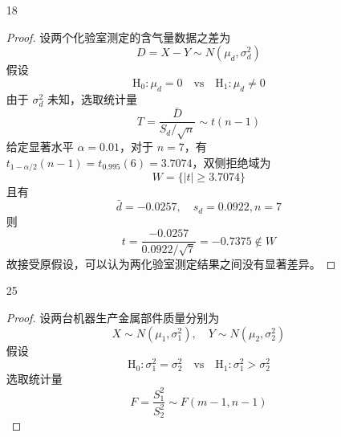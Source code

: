 \documentclass[normal,founder,mtpro2,cn]{elegantnote}
\begin{document}
\begin{enumerate}
\begin{proof}
        \end{proof}
    \item[18]
        \begin{proof}
            设两个化验室测定的含气量数据之差为
            \begin{equation*}
                D=X-Y\sim N\left(\mu_{d},\sigma_{d}^{2}\right)
            \end{equation*}
            假设
            \begin{equation*}
                \mathrm{H}_{0}:\mu_{d}=0\quad\text{vs}\quad\mathrm{H}_{1}:\mu_{d}\neq 0
            \end{equation*}
            由于 $\sigma_{d}^{2}$ 未知，选取统计量
            \begin{equation*}
                T=\frac{\bar{D}}{S_{d}/\sqrt{n}}\sim t(n-1)
            \end{equation*}
            给定显著水平 $\alpha=0.01$，对于 $n=7$，有 $t_{1-\alpha/2}(n-1)=t_{0.995}(6)=3.7074$，双侧拒绝域为
            \begin{equation*}
                W=\{|t| \geq 3.7074\}
            \end{equation*}
            且有
            \begin{equation*}
                \bar{d}=-0.0257,\quad s_{d}=0.0922,n=7
            \end{equation*}
            则
            \begin{equation*}
                t=\frac{-0.0257}{0.0922/\sqrt{7}}=-0.7375\notin W
            \end{equation*}
            故接受原假设，可以认为两化验室测定结果之间没有显著差异。
        \end{proof}
    \item[25]
        \begin{proof}
            设两台机器生产金属部件质量分别为
            \begin{equation*}
                X\sim N\left(\mu_{1},\sigma_{1}^{2}\right),\quad Y\sim N\left(\mu_{2},\sigma_{2}^{2}\right)
            \end{equation*}
            假设
            \begin{equation*}
                \mathrm{H}_{0}:\sigma_{1}^{2}=\sigma_{2}^{2}\quad\text{vs}\quad\mathrm{H}_{1}:\sigma_{1}^{2}>\sigma_{2}^{2}
            \end{equation*}
            选取统计量
            \begin{equation*}
                F=\frac{S_{1}^{2}}{S_{2}^{2}}\sim F(m-1,n-1)

\end{equation*}
\end{proof}
\end{enumerate}
\end{document}
